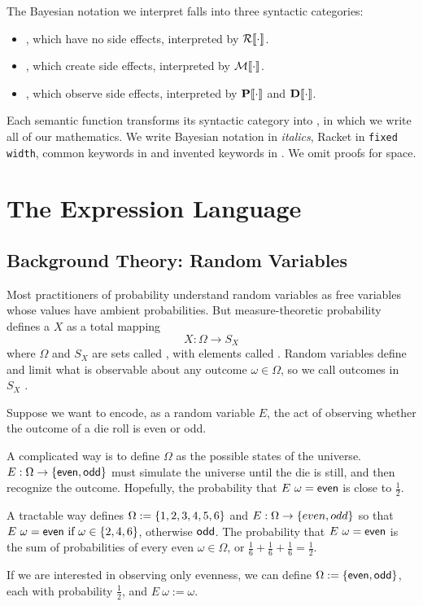 The Bayesian notation we interpret falls into three syntactic categories:
\begin{itemize}
\item {}, which have no side effects, interpreted by $\mathcal{R}\!\left\llbracket{\cdot}\right\rrbracket$.
\item {}, which create side effects, interpreted by $\mathcal{M}\!\left\llbracket{\cdot}\right\rrbracket$.
\item {}, which observe side effects, interpreted by $\mathbf{P}\!\left\llbracket{\cdot}\right\rrbracket$ and $\mathbf{D}\!\left\llbracket{\cdot}\right\rrbracket$.
\end{itemize}
Each semantic function transforms its syntactic category into \targetlang, in which we write all of our mathematics.
We write Bayesian notation in \textit{italics}, Racket in \texttt{fixed width}, common keywords in  and invented keywords in . We omit proofs for space.


\section{The Expression Language}
\label{section:random-variables}

\subsection{Background Theory: Random Variables}

Most practitioners of probability understand random variables as free variables whose values have ambient probabilities. But measure-theoretic probability defines a  $X$ as a total mapping
\begin{equation}
	X : \Omega \to S_X
\end{equation}
where $\Omega$ and $S_X$ are sets called , with elements called . Random variables define and limit what is observable about any outcome $\omega \in \Omega$, so we call outcomes in $S_X$ .

\begin{example}
\label{example:even/odd}
Suppose we want to encode, as a random variable $E$, the act of observing whether the outcome of a die roll is even or odd.

A complicated way is to define $\Omega$ as the possible states of the universe. $E : \Omega \to \{{\mathsf{even},\mathsf{odd}}\}$ must simulate the universe until the die is still, and then recognize the outcome. Hopefully, the probability that $E~\omega = \mathsf{even}$ is close to $\frac{1}{2}$.

A tractable way defines $\Omega := \{{1,2,3,4,5,6}\}$ and $E : \Omega \to \{{even,odd}\}$ so that $E~\omega = \mathsf{even} \text{ if } \omega \in \{{2,4,6}\}$, otherwise $\mathsf{odd}$. The probability that $E~\omega = \mathsf{even}$ is the sum of probabilities of every even $\omega \in \Omega$, or $\tfrac{1}{6} + \tfrac{1}{6} + \tfrac{1}{6} = \tfrac{1}{2}$.

If we are interested in observing only evenness, we can define $\Omega := \{{\mathsf{even},\mathsf{odd}}\}$, each with probability $\tfrac{1}{2}$, and $E~\omega := \omega$.
\exampleqed
\end{example}

